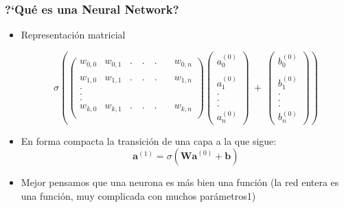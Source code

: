 \documentclass[10pt]{beamer}
\begin{document}
\begin{frame}
\frametitle{?`Qu\'e es una Neural Network?}
\begin{beamerboxesrounded}[upper=uppercolor, lower=lowercolor, shadow=true]{} 

\begin{itemize}
\item Representaci\'on matricial 

\begin{equation*}
\sigma (
\begin{pmatrix}
w_{0,0} & w_{0,1} & . \quad . \quad . \quad & w_{0,n} \\
\\
w_{1,0} & w_{1,1} & . \quad . \quad . \quad & w_{1,n} \\
. \\
. \\
. \\
w_{k,0} & w_{k,1} & . \quad . \quad . \quad & w_{k,n} \\
\end{pmatrix}
\begin{pmatrix}
a_{0}^{(0)} \\
\\
a_{1}^{(0)} \\
. \\
. \\
. \\
a_{n}^{(0)} 
\end{pmatrix}
\: + \:
\begin{pmatrix}
b_{0}^{(0)} \\
\\
b_{1}^{(0)} \\
. \\
. \\
. \\
b_{n}^{(0)} 
\end{pmatrix}
) 
\end{equation*}

\item En forma compacta la transici\'on de una capa a la que sigue:
\begin{equation*}
\mathbf{a}^{(1)}=\sigma(\mathbf{Wa}^{(0)}+\mathbf{b})
\end{equation*}

\item Mejor pensamos que una neurona es m\'as bien una funci\'on (la red entera es una funci\'on, muy complicada con muchos par\'ametros1)
\end{itemize} 

\end{beamerboxesrounded}


\end{frame}
\end{document}
